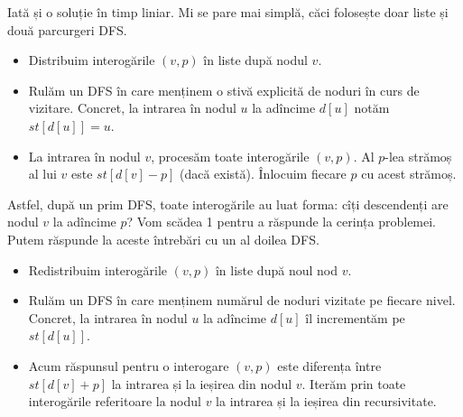 \documentclass[../main.tex]{subfiles}
\begin{document}
Iată și o soluție în timp liniar. Mi se pare mai simplă, căci folosește doar liste și două parcurgeri DFS.

\begin{itemize}
  \item Distribuim interogările $(v, p)$ în liste după nodul $v$.

  \item Rulăm un DFS în care menținem o stivă explicită de noduri în curs de vizitare. Concret, la intrarea în nodul $u$ la adîncime $d[u]$ notăm $st[d[u]] = u$.

  \item La intrarea în nodul $v$, procesăm toate interogările $(v, p)$. Al $p$-lea strămoș al lui $v$ este $st[d[v] - p]$ (dacă există). Înlocuim fiecare $p$ cu acest strămoș.
\end{itemize}

Astfel, după un prim DFS, toate interogările au luat forma: cîți descendenți are nodul $v$ la adîncime $p$? Vom scădea 1 pentru a răspunde la cerința problemei. Putem răspunde la aceste întrebări cu un al doilea DFS.

\begin{itemize}
  \item Redistribuim interogările $(v, p)$ în liste după noul nod $v$.

  \item Rulăm un DFS în care menținem numărul de noduri vizitate pe fiecare nivel. Concret, la intrarea în nodul $u$ la adîncime $d[u]$ îl incrementăm pe $st[d[u]]$.

  \item Acum răspunsul pentru o interogare $(v, p)$ este diferența între $st[d[v] + p]$ la intrarea și la ieșirea din nodul $v$. Iterăm prin toate interogările referitoare la nodul $v$ la intrarea și la ieșirea din recursivitate.
\end{itemize}
\end{document}
